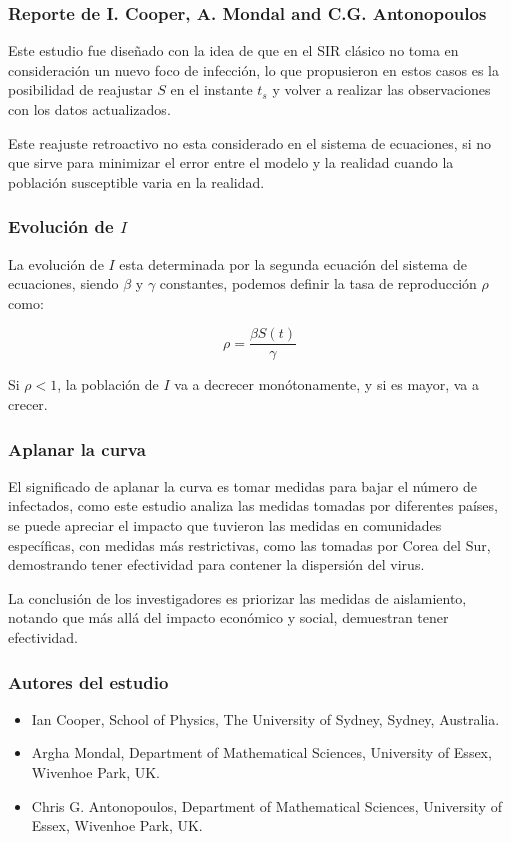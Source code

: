 \documentclass{beamer}
\begin{document}
\begin{frame}
    \frametitle{Reporte de I. Cooper, A. Mondal and C.G. Antonopoulos}

    Este estudio fue diseñado con la idea de que en el SIR clásico no toma en consideración un nuevo foco de infección, lo que propusieron en estos casos es la posibilidad de reajustar \(S\) en el instante \(t_s\) y volver a realizar las observaciones con los datos actualizados.

    Este reajuste retroactivo no esta considerado en el sistema de ecuaciones, si no que sirve para minimizar el error entre el modelo y la realidad cuando la población susceptible varia en la realidad.
\end{frame}

\begin{frame}
    \frametitle{Evolución de \(I\)}

    La evolución de \(I\) esta determinada por la segunda ecuación del sistema de ecuaciones, siendo \(\beta\) y \(\gamma\) constantes, podemos definir la tasa de reproducción \(\rho\) como:

    \[
        \rho = \frac{\beta S(t)}{\gamma}
    \]

    Si \(\rho < 1\), la población de \(I\) va a decrecer monótonamente, y si es mayor, va a crecer.


\end{frame}

\begin{frame}
    \frametitle{Aplanar la curva}

    El significado de aplanar la curva es tomar medidas para bajar el número de infectados, como este estudio analiza las medidas tomadas por diferentes países, se puede apreciar el impacto que tuvieron las medidas en comunidades específicas, con medidas más restrictivas, como las tomadas por Corea del Sur, demostrando tener efectividad para contener la dispersión del virus.

    La conclusión de los investigadores es priorizar las medidas de aislamiento, notando que más allá del impacto económico y social, demuestran tener efectividad.
\end{frame}

\begin{frame}
    \frametitle{Autores del estudio}

    \begin{itemize}
        \item Ian Cooper, School of Physics, The University of Sydney, Sydney, Australia.
        \item Argha Mondal, Department of Mathematical Sciences, University of Essex, Wivenhoe Park, UK.
        \item Chris G. Antonopoulos, Department of Mathematical Sciences, University of Essex, Wivenhoe Park, UK.
    \end{itemize}
\end{frame}
\end{document}
